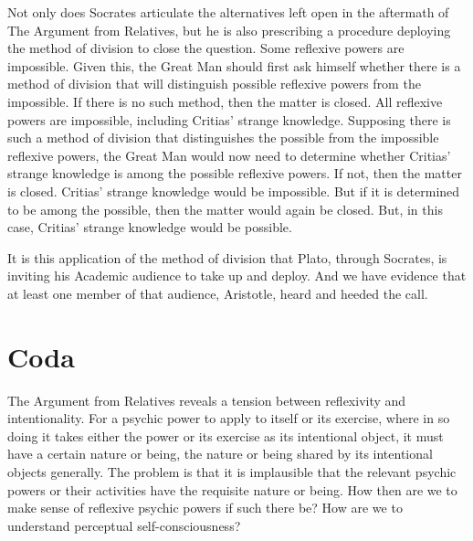 Not only does Socrates articulate the alternatives left open in the aftermath of The Argument from Relatives, but he is also prescribing a procedure deploying the method of division to close the question. Some reflexive powers are impossible. Given this, the Great Man should first ask himself whether there is a method of division that will distinguish possible reflexive powers from the impossible. If there is no such method, then the matter is closed. All reflexive powers are impossible, including Critias' strange knowledge. Supposing there is such a method of division that distinguishes the possible from the impossible reflexive powers, the Great Man would now need to determine whether Critias' strange knowledge is among the possible reflexive powers. If not, then the matter is closed. Critias' strange knowledge would be impossible. But if it is determined to be among the possible, then the matter would again be closed. But, in this case, Critias' strange knowledge would be possible.

It is this application of the method of division that Plato, through Socrates, is inviting his Academic audience to take up and deploy. And we have evidence that at least one member of that audience, Aristotle, heard and heeded the call.


\section{Coda} %
\label{sec:coda}

The Argument from Relatives reveals a tension between reflexivity and intentionality. For a psychic power to apply to itself or its exercise, where in so doing it takes either the power or its exercise as its intentional object, it must have a certain nature or being, the nature or being shared by its intentional objects generally. The problem is that it is implausible that the relevant psychic powers or their activities have the requisite nature or being. How then are we to make sense of reflexive psychic powers if such there be? How are we to understand perceptual self-consciousness?

